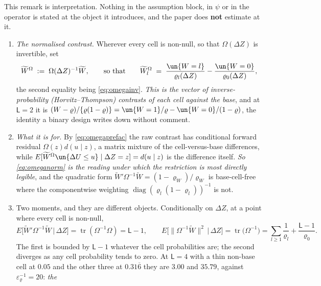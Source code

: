 \begin{remark}\label{rem:htread}
This remark is interpretation. Nothing in the assumption block, in $\psi$ or in the operator is
stated at the object it introduces, and the paper does \textbf{not} estimate at it.
\begin{enumerate}
\item[(1)] \emph{The normalised contrast.} Wherever every cell is non-null, so that $\Omega(\Delta Z)$
is invertible, set
\begin{equation}\label{eq:omeganorm}
\widetilde W^{\Omega}\;:=\;\Omega(\Delta Z)^{-1}\widetilde W ,
\qquad\text{so that}\qquad
\widetilde W^{\Omega}_l\;=\;\frac{\un\{W=l\}}{\varrho_l(\Delta Z)}-\frac{\un\{W=0\}}{\varrho_0(\Delta Z)} ,
\end{equation}
the second equality being \eqref{eq:omegainv}. \emph{This is the vector of inverse-probability
{\upshape(}Horvitz--Thompson{\upshape)} contrasts of each cell against the base}, and at $\mathsf L=2$ it
is $(W-\varrho)/\{\varrho(1-\varrho)\}=\un\{W=1\}/\varrho-\un\{W=0\}/(1-\varrho)$, the identity a binary
design writes down without comment.
\item[(2)] \emph{What it is for.} By \eqref{eq:omegaprefac} the raw contrast has conditional forward
residual $\Omega(z)d(u\mid z)$, a matrix mixture of the cell-versus-base differences, while
$E[\widetilde W^{\Omega}\un\{\Delta U\le u\}\mid\Delta Z=z]=d(u\mid z)$ is the difference itself. \emph{So
\eqref{eq:omeganorm} is the reading under which the restriction is most directly legible}, and the
quadratic form $\widetilde W'\Omega^{-1}\widetilde W=(1-\varrho_W)/\varrho_W$ is base-cell-free where the
componentwise weighting $\operatorname{diag}(\varrho_l(1-\varrho_l))^{-1}$ is not.
\item[(3)] Two moments, and they are different objects. Conditionally on $\Delta Z$, at a point
where every cell is non-null,
\[
E\big[\widetilde W'\Omega^{-1}\widetilde W\,\big|\,\Delta Z\big]=\operatorname{tr}(\Omega^{-1}\Omega)=\mathsf L-1 ,
\qquad
E\big[\big\|\Omega^{-1}\widetilde W\big\|^{2}\,\big|\,\Delta Z\big]=\operatorname{tr}\big(\Omega^{-1}\big)
=\sum_{l\ge1}\frac1{\varrho_l}+\frac{\mathsf L-1}{\varrho_0} .
\]
The first is bounded by $\mathsf L-1$ whatever the cell probabilities are; the second diverges as
any cell probability tends to zero. At $\mathsf L=4$ with a thin non-base cell at $0.05$ and the other
three at $0.31\overline{6}$ they are $3.00$ and $35.79$, against $\varepsilon_\varrho^{-1}=20$: \emph{the
}
\end{enumerate}
\end{remark}
